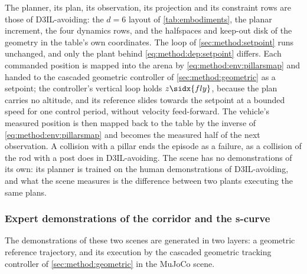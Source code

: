The planner, its plan, its observation, its projection and its constraint rows are those of D3IL-avoiding:
the $d = 6$ layout of \autoref{tab:embodiments}, the planar increment, the four dynamics rows, and the
halfspaces and keep-out disk of the geometry in the table's own coordinates. The loop of
\autoref{sec:method:setpoint} runs unchanged, and only the plant behind \eqref{eq:method:dep:setpoint}
differs. Each commanded position is mapped into the arena by \eqref{eq:method:env:pillarsmap} and handed
to the cascaded geometric controller of \autoref{sec:method:geometric} as a setpoint; the controller's
vertical loop holds $z\sidx{fly}$, because the plan carries no altitude, and its reference slides towards
the setpoint at a bounded speed for one control period, without velocity feed-forward. The vehicle's
measured position is then mapped back to the table by the inverse of \eqref{eq:method:env:pillarsmap}
and becomes the measured half of the next observation. A collision with a pillar ends the episode as a
failure, as a collision of the rod with a post does in D3IL-avoiding. The scene has no demonstrations of its own:
its planner is trained on the human demonstrations of D3IL-avoiding, and what the scene measures is the
difference between two plants executing the same plans.

\subsubsection*{Expert demonstrations of the corridor and the s-curve}

The demonstrations of these two scenes are generated in two layers: a geometric reference trajectory,
and its execution by the cascaded geometric tracking controller of \autoref{sec:method:geometric} in the
MuJoCo scene.

